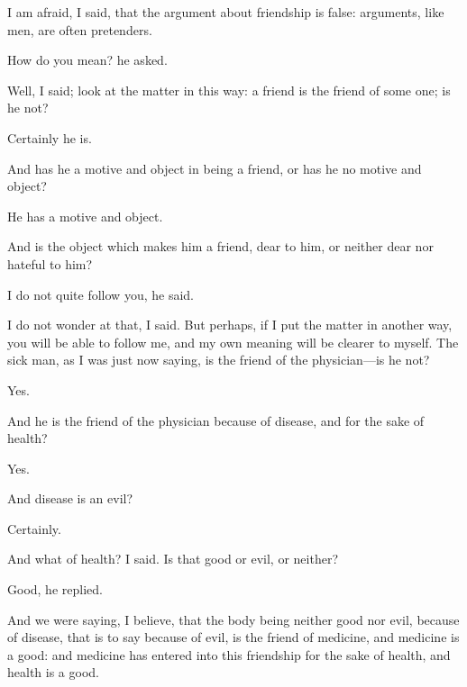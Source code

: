 \documentclass[11pt,letter]{article}
\begin{document}
\par  I am afraid, I said, that the argument about friendship is false: arguments, like men, are often pretenders.

\par  How do you mean? he asked.

\par  Well, I said; look at the matter in this way: a friend is the friend of some one; is he not?

\par  Certainly he is.

\par  And has he a motive and object in being a friend, or has he no motive and object?

\par  He has a motive and object.

\par  And is the object which makes him a friend, dear to him, or neither dear nor hateful to him?

\par  I do not quite follow you, he said.

\par  I do not wonder at that, I said. But perhaps, if I put the matter in another way, you will be able to follow me, and my own meaning will be clearer to myself. The sick man, as I was just now saying, is the friend of the physician—is he not?

\par  Yes.

\par  And he is the friend of the physician because of disease, and for the sake of health?

\par  Yes.

\par  And disease is an evil?

\par  Certainly.

\par  And what of health? I said. Is that good or evil, or neither?

\par  Good, he replied.

\par  And we were saying, I believe, that the body being neither good nor evil, because of disease, that is to say because of evil, is the friend of medicine, and medicine is a good: and medicine has entered into this friendship for the sake of health, and health is a good.
\end{document}
